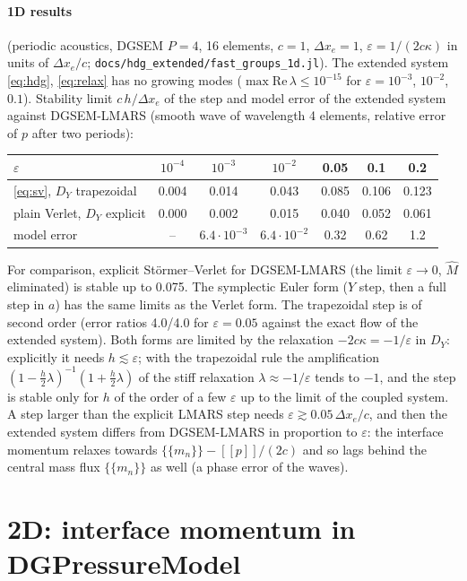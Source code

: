 \documentclass[11pt,a4paper]{article}
\newcommand{\avg}[1]{\{\!\{#1\}\!\}}
\newcommand{\jump}[1]{[\![#1]\!]}
\newcommand{\code}[1]{\texttt{#1}}
\begin{document}
\paragraph{1D results} (periodic acoustics, DGSEM $P=4$, 16 elements, $c=1$, $\Delta x_e=1$, $\varepsilon=1/(2c\kappa)$ in units of $\Delta x_e/c$;
\code{docs/hdg\_extended/fast\_groups\_1d.jl}). The extended system \eqref{eq:hdg}, \eqref{eq:relax} has no growing modes ($\max\mathrm{Re}\,\lambda\le10^{-15}$ for
$\varepsilon=10^{-3}$, $10^{-2}$, $0.1$). Stability limit $c\,h/\Delta x_e$ of the step and model error of the extended system against DGSEM-LMARS
(smooth wave of wavelength 4 elements, relative error of $p$ after two periods):
\begin{center}\small
\begin{tabular}{lcccccc}\toprule
$\varepsilon$ & $10^{-4}$ & $10^{-3}$ & $10^{-2}$ & 0.05 & 0.1 & 0.2\\\midrule
\eqref{eq:sv}, $D_Y$ trapezoidal & 0.004 & 0.014 & 0.043 & 0.085 & 0.106 & 0.123\\
plain Verlet, $D_Y$ explicit & 0.000 & 0.002 & 0.015 & 0.040 & 0.052 & 0.061\\
model error & -- & $6.4\cdot10^{-3}$ & $6.4\cdot10^{-2}$ & 0.32 & 0.62 & 1.2\\\bottomrule
\end{tabular}
\end{center}
For comparison, explicit Störmer--Verlet for DGSEM-LMARS (the limit $\varepsilon\to0$, $\hat M$ eliminated) is stable up to 0.075. The
symplectic Euler form ($Y$ step, then a full step in $a$) has the same limits as the Verlet form. The trapezoidal step is of second
order (error ratios 4.0/4.0 for $\varepsilon=0.05$ against the exact flow of the extended system). Both forms are limited by the
relaxation $-2c\kappa=-1/\varepsilon$ in $D_Y$: explicitly it needs $h\lesssim\varepsilon$; with the trapezoidal rule the amplification
$(1-\tfrac h2\lambda)^{-1}(1+\tfrac h2\lambda)$ of the stiff relaxation $\lambda\approx-1/\varepsilon$ tends to $-1$, and the step is stable only for $h$ of the
order of a few $\varepsilon$ up to the limit of the coupled system. A step larger than the explicit LMARS step needs $\varepsilon\gtrsim0.05\,\Delta x_e/c$,
and then the extended system differs from DGSEM-LMARS in proportion to $\varepsilon$: the interface momentum relaxes towards
$\avg{m_n}-\jump p/(2c)$ and so lags behind the central mass flux $\avg{m_n}$ as well (a phase error of the waves).

\section{2D: interface momentum in DGPressureModel}
\end{document}

